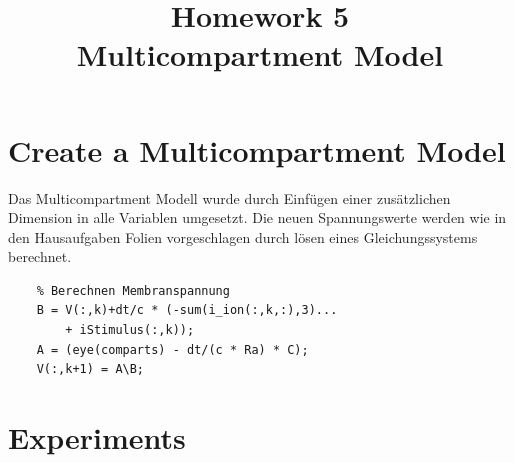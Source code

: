 \documentclass[conference]{IEEEtran}
\begin{document}
%
%
\title{Homework 5\\ Multicompartment Model}

\author{
}


\maketitle

\IEEEpeerreviewmaketitle

\section{Create a Multicompartment Model}
Das Multicompartment Modell wurde durch Einfügen einer zusätzlichen Dimension in alle Variablen umgesetzt. Die neuen Spannungswerte werden wie in den Hausaufgaben Folien vorgeschlagen durch lösen eines Gleichungssystems berechnet.

\begin{lstlisting}
    % Berechnen Membranspannung
    B = V(:,k)+dt/c * (-sum(i_ion(:,k,:),3)...
        + iStimulus(:,k));
    A = (eye(comparts) - dt/(c * Ra) * C);
    V(:,k+1) = A\B;
\end{lstlisting}

\section{Experiments}
\end{document}
